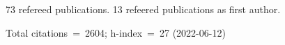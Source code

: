 73 refereed publications. 13 refeered publications as first author.

Total citations~=~2604; h-index~=~27 (2022-06-12)